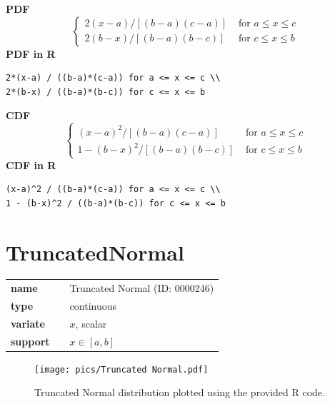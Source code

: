 \documentclass{article}
\begin{document}
\smallskip \noindent \hspace{.2cm} \textbf{PDF} 
\begin{equation*}\begin{cases}
2(x-a) / [(b-a)(c-a)] & \text{ for } a \leq x \leq c \\
2(b-x) / [(b-a)(b-c)] & \text{ for } c \leq x \leq b
\end{cases}\end{equation*}
\smallskip \noindent \hspace{.2cm} \textbf{PDF in R}  
\begin{verbatim}2*(x-a) / ((b-a)*(c-a)) for a <= x <= c \\
2*(b-x) / ((b-a)*(b-c)) for c <= x <= b \end{verbatim}
\smallskip \noindent \hspace{.2cm} \textbf{CDF} 
\begin{equation*}\begin{cases}
(x-a)^2 / [(b-a)(c-a)] & \text{ for } a \leq x \leq c \\
1 - (b-x)^2 / [(b-a)(b-c)] & \text{ for } c \leq x \leq b
\end{cases}\end{equation*}
\smallskip \noindent \hspace{.2cm} \textbf{CDF in R} 
\begin{verbatim}(x-a)^2 / ((b-a)*(c-a)) for a <= x <= c \\
1 - (b-x)^2 / ((b-a)*(b-c)) for c <= x <= b \end{verbatim}
\smallskip\section*{TruncatedNormal} 

  \bigskip 

\begin{tabular}{p{2cm}cl}
\textbf{name} & & Truncated Normal (ID: 0000246)\\ 
 
\textbf{type} & & continuous \\ 

\textbf{variate} & & $x$, scalar \\ 

\textbf{support} & & $x \in [a,b]$
\end{tabular}

\begin{figure}[ht!]
\centering
  \texttt{[image: pics/Truncated Normal.pdf]}
 \caption{Truncated Normal distribution plotted using the provided R code.}
 \label{fig:Truncated Normal}
\end{figure}
\end{document}
